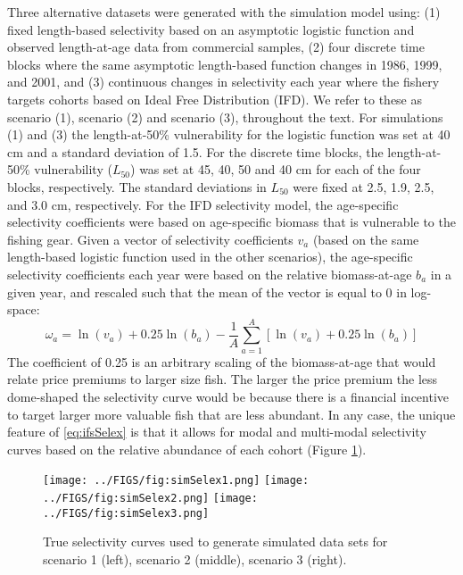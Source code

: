 Three alternative datasets were generated with the simulation model using: (1) fixed length-based selectivity based on an asymptotic logistic function and observed length-at-age data from commercial samples, (2) four discrete time blocks where the same asymptotic length-based function changes in 1986, 1999, and 2001, and (3) continuous changes in selectivity each year where the fishery targets cohorts based on Ideal Free Distribution (IFD).  We refer to these as scenario (1), scenario (2) and scenario (3), throughout the text.  For simulations (1) and (3) the length-at-50\% vulnerability for the logistic function was set at 40 cm and a standard deviation of 1.5.  For the discrete time blocks, the length-at-50\% vulnerability ($L_{50}$) was set at 45, 40, 50 and 40 cm for each of the four blocks, respectively.  The standard deviations in $L_{50}$ were fixed at 2.5, 1.9, 2.5, and 3.0 cm, respectively.  For the IFD selectivity model, the age-specific selectivity coefficients were based on age-specific biomass that is vulnerable to the fishing gear.  Given a vector of selectivity coefficients $v_a$ (based on the same length-based logistic function used in the other scenarios), the age-specific selectivity coefficients each year were based on the relative biomass-at-age $b_a$ in a given year, and rescaled such that the mean of the vector is equal to 0 in log-space:
\begin{equation}\label{eq:ifsSelex}
	\omega_a = \ln(v_a) + 0.25\ln(b_a) - 
	\frac{1}{A}\sum_{a=1}^A \left[ \ln(v_a) + 0.25\ln(b_a)\right]
\end{equation}
The coefficient of 0.25 is an arbitrary scaling of the biomass-at-age that would relate price premiums to larger size fish.  The larger the price premium the less dome-shaped the selectivity curve would be because there is a financial incentive to target larger more valuable fish that are less abundant.  In any case, the unique feature of \eqref{eq:ifsSelex} is that it allows for modal and multi-modal selectivity curves based on the relative abundance of each cohort (Figure \ref{fig:simSelex}).

\begin{figure}[!tbh]
	\begin{center}
		\texttt{[image: ../FIGS/fig:simSelex1.png]}
		\hspace{-1.25cm}
		\texttt{[image: ../FIGS/fig:simSelex2.png]}
		\hspace{-1.25cm}
		\texttt{[image: ../FIGS/fig:simSelex3.png]}
	\end{center}
	\caption{True selectivity curves used to generate simulated data sets for scenario 1 (left), scenario 2 (middle), scenario 3 (right).}
	\label{fig:simSelex}
\end{figure}

